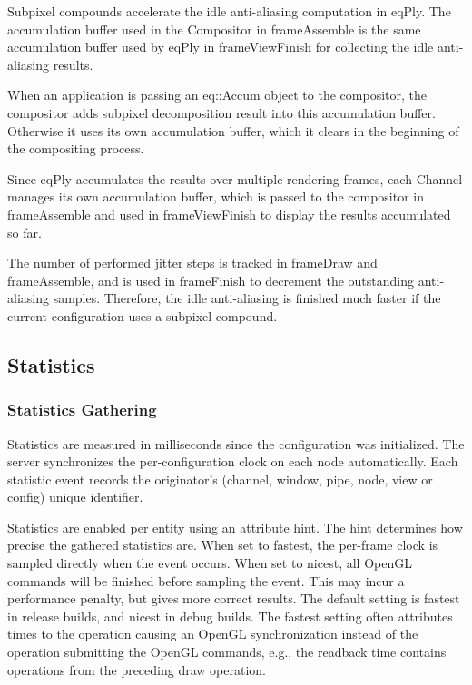 \documentclass[10pt,a4]{scrartcl}
\begin{document}
Subpixel compounds accelerate the idle anti-aliasing computation in eqPly. The
accumulation buffer used in the \textsf{Compositor} in \textsf{frameAssemble} is
the same accumulation buffer used by eqPly in \textsf{frameViewFinish} for
collecting the idle anti-aliasing results.

When an application is passing an \textsf{eq::Accum} object to the compositor,
the compositor adds subpixel decomposition result into this accumulation
buffer. Otherwise it uses its own accumulation buffer, which it clears in the
beginning of the compositing process.

Since \textsf{eqPly} accumulates the results over multiple rendering frames,
each \textsf{Channel} manages its own accumulation buffer, which is passed to
the compositor in \textsf{frameAssemble} and used in \textsf{frameViewFinish} to
display the results accumulated so far.

The number of performed jitter steps is tracked in \textsf{frameDraw} and
\textsf{frameAssemble}, and is used in \textsf{frameFinish} to decrement the
outstanding anti-aliasing samples. Therefore, the idle anti-aliasing is finished
much faster if the current configuration uses a subpixel compound.

\subsection{\label{sStatistics}Statistics}

\subsubsection{Statistics Gathering}

Statistics are measured in milliseconds since the configuration was
initialized. The server synchronizes the per-configuration clock on each node
automatically. Each statistic event records the originator's (channel, window,
pipe, node, view or config) unique identifier.

Statistics are enabled per entity using an attribute hint. The hint determines
how precise the gathered statistics are. When set to \textsf{fastest}, the
per-frame clock is sampled directly when the event occurs. When set to
\textsf{nicest}, all OpenGL commands will be finished before sampling the
event. This may incur a performance penalty, but gives more correct results. The
default setting is fastest in release builds, and nicest in debug builds. The
fastest setting often attributes times to the operation causing an OpenGL
synchronization instead of the operation submitting the OpenGL commands, e.g.,
the readback time contains operations from the preceding draw operation.
\end{document}
